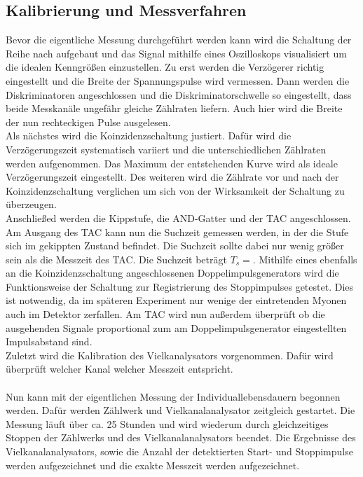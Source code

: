 \subsection{Kalibrierung und Messverfahren}
\label{sub:kalimes}
Bevor die eigentliche Messung durchgeführt werden kann wird die Schaltung der Reihe nach aufgebaut und das Signal mithilfe eines Oszilloskops visualisiert um die idealen Kenngrößen einzustellen.
Zu erst werden die Verzögerer richtig eingestellt und die Breite der Spannungspulse wird vermessen.
Dann werden die Diskriminatoren angeschlossen und die Diskriminatorschwelle so eingestellt, dass beide Messkanäle ungefähr gleiche Zählraten liefern.
Auch hier wird die Breite der nun rechteckigen Pulse ausgelesen.\\
Als nächstes wird die Koinzidenzschaltung justiert. Dafür wird die Verzögerungszeit systematisch variiert und die unterschiedlichen Zählraten werden aufgenommen.
Das Maximum der entstehenden Kurve wird als ideale Verzögerungszeit eingestellt. Des weiteren wird die Zählrate vor und nach der Koinzidenzschaltung verglichen um sich von der Wirksamkeit der Schaltung
zu überzeugen.\\
Anschließed werden die Kippstufe, die AND-Gatter und der TAC angeschlossen. Am Ausgang des TAC kann nun die Suchzeit gemessen werden, in der die Stufe sich im gekippten Zustand befindet.
Die Suchzeit sollte dabei nur wenig größer sein als die Messzeit des TAC. Die Suchzeit beträgt $T_s = $. Mithilfe eines ebenfalls an die Koinzidenzschaltung angeschlossenen Doppelimpulsgenerators wird die Funktionsweise der Schaltung zur Registrierung des Stoppimpulses getestet. Dies ist notwendig, da im späteren Experiment nur wenige der eintretenden Myonen auch im Detektor zerfallen. Am TAC wird nun außerdem überprüft ob die ausgehenden Signale proportional zum am Doppelimpulsgenerator eingestellten Impulsabstand sind.\\
Zuletzt wird die Kalibration des Vielkanalysators vorgenommen. Dafür wird überprüft welcher Kanal welcher Messzeit entspricht.\\
\\
Nun kann mit der eigentlichen Messung der Individuallebensdauern begonnen werden. Dafür werden Zählwerk und Vielkanalanalysator zeitgleich gestartet. Die Messung läuft über ca. 25 Stunden und wird wiederum durch gleichzeitiges Stoppen der Zählwerks und des Vielkanalanalysators beendet. Die Ergebnisse des Vielkanalanalysators, sowie die Anzahl der detektierten Start- und Stoppimpulse werden aufgezeichnet und die exakte Messzeit werden aufgezeichnet.\\
